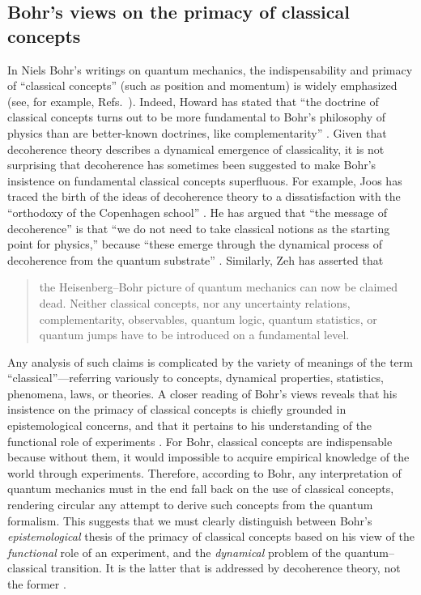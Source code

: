 \documentclass[3p,sort&compress,12pt]{elsarticle}
\begin{document}
\subsection{\label{sec:niels-bohrs-views}Bohr's views on the primacy of classical concepts}

In Niels Bohr's writings on quantum mechanics, the indispensability and primacy of ``classical concepts'' (such as position and momentum) is widely emphasized (see, for example, Refs.~\cite{Bohr:1949:mz,Bohr:1931:ii,Bohr:1935:re,Bohr:1996:mn,Bohr:1987:oo,Bohr:1958:lu}). Indeed, Howard has stated that ``the doctrine of classical concepts turns out to be more fundamental to Bohr's philosophy of physics than are better-known doctrines, like complementarity'' \cite[p.~202]{Howard:1994:lm}. Given that decoherence theory describes a dynamical emergence of classicality, it is not surprising that decoherence has sometimes been suggested to make Bohr's insistence on fundamental classical concepts superfluous. For example, Joos has traced the birth of the ideas of decoherence theory to a dissatisfaction with the ``orthodoxy of the Copenhagen school'' \cite[p.~54]{Joos:2006:yy}. He has argued that ``the message of decoherence'' is that ``we do not need to take classical notions as the starting point for physics,'' because ``these emerge through the dynamical process of decoherence from the quantum substrate'' \cite[p.~77]{Joos:2006:yy}. Similarly, Zeh \cite{Zeh:2000:rr} has asserted that
%
\begin{quote}
the Heisenberg--Bohr picture of quantum mechanics can now be claimed dead. Neither classical concepts, nor any uncertainty relations, complementarity, observables, quantum logic, quantum statistics, or quantum jumps have to be introduced on a fundamental level.
\end{quote}
%
Any analysis of such claims is complicated by the variety of meanings of the term ``classical''---referring variously to concepts, dynamical properties, statistics, phenomena, laws, or theories. A closer reading of Bohr's views reveals that his insistence on the primacy of classical concepts is chiefly grounded in epistemological concerns, and that it pertains to his understanding of the functional role of experiments \cite{Camilleri:2015:oo,Schlosshauer:2017:oo}. For Bohr, classical concepts are indispensable because without them, it would impossible to acquire empirical knowledge of the world through experiments. Therefore, according to Bohr, any interpretation of quantum mechanics must in the end fall back on the use of classical concepts, rendering circular any attempt to derive such concepts from the quantum formalism. This suggests that we must clearly distinguish between Bohr's \emph{epistemological} thesis of the primacy of classical concepts based on his view of the \emph{functional} role of an experiment, and the \emph{dynamical} problem of the quantum--classical transition. It is the latter that is addressed by decoherence theory, not the former  \cite{Camilleri:2015:oo,Schlosshauer:2017:oo}. 
\end{document}
